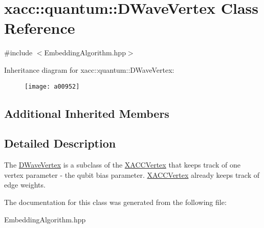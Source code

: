 \hypertarget{a00952}{}\section{xacc\+:\+:quantum\+:\+:D\+Wave\+Vertex Class Reference}
\label{a00952}


{\ttfamily \#include $<$Embedding\+Algorithm.\+hpp$>$}

Inheritance diagram for xacc\+:\+:quantum\+:\+:D\+Wave\+Vertex\+:\begin{figure}[H]
\begin{center}
\leavevmode
\texttt{[image: a00952]}
\end{center}
\end{figure}
\subsection*{Additional Inherited Members}


\subsection{Detailed Description}
The \hyperlink{a00952}{D\+Wave\+Vertex} is a subclass of the \hyperlink{a01172}{X\+A\+C\+C\+Vertex} that keeps track of one vertex parameter -\/ the qubit bias parameter. \hyperlink{a01172}{X\+A\+C\+C\+Vertex} already keeps track of edge weights. 

The documentation for this class was generated from the following file\+:\begin{DoxyCompactItemize}
\item 
Embedding\+Algorithm.\+hpp\end{DoxyCompactItemize}
